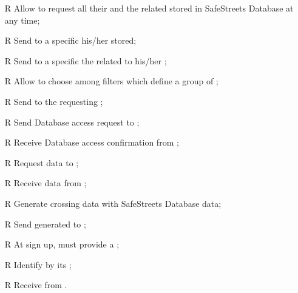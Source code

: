 \documentclass[../../../rasd.tex]{subfiles}
\begin{document}
\begin{itemize}
	\item[R\subs{20}]Allow  to request all their  and the related  stored in SafeStreets Database at any time;
	\item[R\subs{21}]Send to a specific  his/her  stored;
	\item[R\subs{22}]Send to a specific  the  related to his/her ;
	\item[R\subs{23}]Allow  to choose among filters which define a group of ;
	\item[R\subs{24}]Send  to the requesting ;
	\item[R\subs{25}]Send  Database access request to ; 
	\item[R\subs{26}]Receive  Database access confirmation from ;
	\item[R\subs{27}]Request  data to ;
	\item[R\subs{28}]Receive  data from ;
	\item[R\subs{29}]Generate  crossing   data with SafeStreets Database data;
	\item[R\subs{30}]Send generated  to ;
	\item[R\subs{31}]At sign up,  must provide a ; %
	\item[R\subs{32}]Identify  by its ;
	\item[R\subs{33}]Receive  from .

	
\end{itemize}
\end{document}

